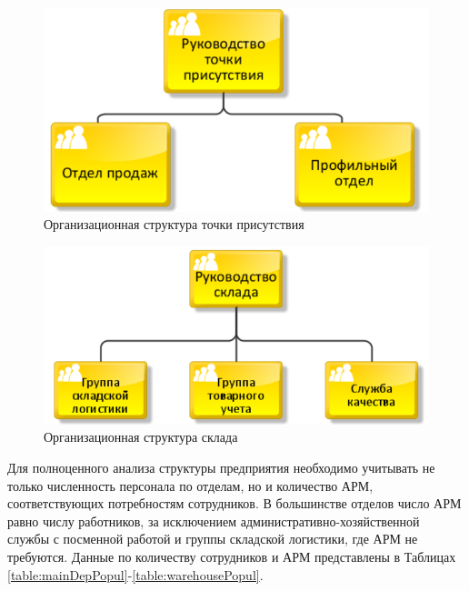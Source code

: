 \documentclass[14pt, a4paper]{extarticle}
\numberwithin{equation}{section}
\begin{document}
\begin{figure}[H]
        \centering
        \includegraphics[scale=0.6]{ARIS_tpStructure.png}
        \caption{Организационная структура точки присутствия}
        \label{fig:tpStructure}
\end{figure}

\begin{figure}[H]
        \centering
        \includegraphics[scale=0.6]{ARIS_warehouseStructure.png}
        \caption{Организационная структура склада}
        \label{fig:warehouseStructure}
\end{figure}

Для полноценного анализа структуры предприятия необходимо учитывать не 
только численность персонала по отделам, но и количество АРМ, 
соответствующих потребностям сотрудников. В большинстве отделов число 
АРМ равно числу работников, за исключением административно-хозяйственной 
службы с посменной работой и группы складской логистики, где АРМ не требуются. 
Данные по количеству сотрудников и АРМ представлены в Таблицах 
\ref{table:mainDepPopul}-\ref{table:warehousePopul}.
\end{document}
